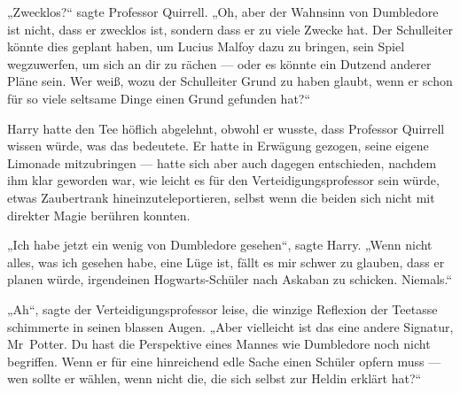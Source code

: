 „Zwecklos?“ sagte Professor Quirrell.
„Oh, aber der Wahnsinn von Dumbledore ist nicht, dass er zwecklos ist, sondern dass er zu viele Zwecke hat. Der Schulleiter könnte dies geplant haben, um Lucius Malfoy dazu zu bringen, sein Spiel wegzuwerfen, um sich an dir zu rächen — oder es könnte ein Dutzend anderer Pläne sein. Wer weiß, wozu der Schulleiter Grund zu haben glaubt, wenn er schon für so viele seltsame Dinge einen Grund gefunden hat?“

Harry hatte den Tee höflich abgelehnt, obwohl er wusste, dass Professor Quirrell wissen würde, was das bedeutete. Er hatte in Erwägung gezogen, seine eigene Limonade mitzubringen — hatte sich aber auch dagegen entschieden, nachdem ihm klar geworden war, wie leicht es für den Verteidigungsprofessor sein würde, etwas Zaubertrank hineinzuteleportieren, selbst wenn die beiden sich nicht mit direkter Magie berühren konnten.

„Ich habe jetzt ein wenig von Dumbledore gesehen“, sagte Harry.
„Wenn nicht alles, was ich gesehen habe, eine Lüge ist, fällt es mir schwer zu glauben, dass er planen würde, irgendeinen Hogwarts-Schüler nach Askaban zu schicken. Niemals.“

„Ah“, sagte der Verteidigungsprofessor leise, die winzige Reflexion der Teetasse schimmerte in seinen blassen Augen.
„Aber vielleicht ist das eine andere Signatur, Mr~Potter. Du hast die Perspektive eines Mannes wie Dumbledore noch nicht begriffen. Wenn er für eine hinreichend edle Sache einen Schüler opfern muss — wen sollte er wählen, wenn nicht die, die sich selbst zur Heldin erklärt hat?“

